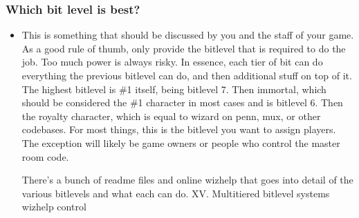 \documentclass[letterpaper,10pt,english]{sphinxmanual}
\begin{document}
\subsubsection{Which bit level is best?}
\label{\detokenize{features:which-bit-level-is-best}}\begin{itemize}
\item {} 
\sphinxAtStartPar
This is something that should be discussed by you and the staff
of your game.  As a good rule of thumb, only provide the bitlevel
that is required to do the job.  Too much power is always risky.
In essence, each tier of bit can do everything the previous bitlevel
can do, and then additional stuff on top of it.  The highest bitlevel
is \#1 itself, being bitlevel 7.  Then immortal, which should be
considered the \#1 character in most cases and is bitlevel 6.  Then
the royalty character, which is equal to wizard on penn, mux, or
other codebases.  For most things, this is the bitlevel you want
to assign players.  The exception will likely be game owners or
people who control the master room code.

\sphinxAtStartPar
There’s a bunch of readme files and online wizhelp that goes into
detail of the various bitlevels and what each can do.
\sphinxhyphen{} XV.   Multi\sphinxhyphen{}tiered bitlevel systems
\sphinxhyphen{} wizhelp control

\end{itemize}
\end{document}
